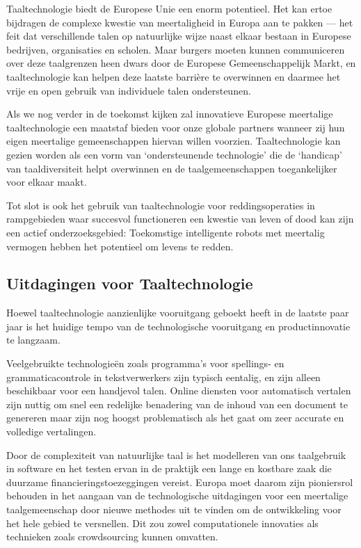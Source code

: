 \documentclass[]{../../metanetpaper}
\begin{document}
\begin{multicols}{2}

    Taaltechnologie biedt de Europese Unie een enorm potentieel. Het kan ertoe bijdragen de complexe kwestie van meertaligheid in Europa aan te pakken --- het feit dat verschillende talen op natuurlijke wijze naast elkaar bestaan in Europese bedrijven, organisaties en scholen. Maar burgers moeten kunnen communiceren over deze taalgrenzen heen dwars door de Europese Gemeenschappelijk Markt, en taaltechnologie kan helpen deze laatste barri{\`e}re te overwinnen en daarmee het vrije en open gebruik van individuele talen ondersteunen. 

Als we nog verder in de toekomst kijken zal innovatieve Europese meertalige taaltechnologie een maatstaf bieden voor onze globale partners wanneer zij hun eigen meertalige gemeenschappen hiervan willen voorzien. Taaltechnologie kan gezien worden als een vorm van `ondersteunende technologie' die de `handicap' van taaldiversiteit helpt overwinnen en de taalgemeenschappen toegankelijker voor elkaar maakt.

  Tot slot is ook het gebruik van taaltechnologie voor reddingsoperaties in rampgebieden waar succesvol functioneren een kwestie van leven of dood kan zijn een actief onderzoeksgebied: Toekomstige intelligente robots met meertalig vermogen hebben het potentieel om levens te redden.

\subsection{Uitdagingen voor Taaltechnologie}

Hoewel taaltechnologie aanzienlijke vooruitgang geboekt heeft in de laatste paar jaar is het huidige tempo van de technologische vooruitgang en productinnovatie te langzaam. 


Veelgebruikte technologie{\"e}n zoals programma's voor spellings- en grammaticacontrole in tekstverwerkers zijn typisch eentalig, en zijn alleen beschikbaar voor een handjevol talen. Online diensten voor automatisch vertalen zijn nuttig om snel een redelijke benadering van de inhoud van een document te genereren maar zijn nog hoogst problematisch als het gaat om zeer accurate en volledige vertalingen. 

Door de complexiteit van natuurlijke taal is het modelleren van ons taalgebruik in software en het testen ervan in de praktijk een lange en kostbare zaak die duurzame financieringstoezeggingen vereist. Europa moet daarom zijn pioniersrol behouden in het aangaan van de technologische uitdagingen voor een meertalige taalgemeenschap door nieuwe methodes uit te vinden om de ontwikkeling voor het hele gebied te versnellen. Dit zou zowel computationele innovaties als technieken zoals crowdsourcing kunnen omvatten.


\end{multicols}
\end{document}
